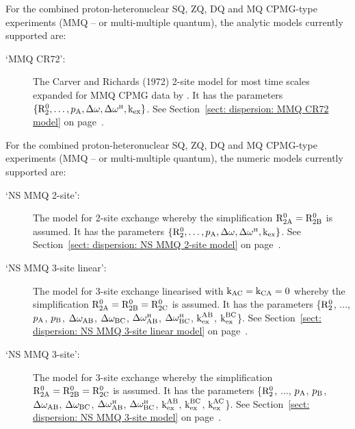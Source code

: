 For the combined proton-heteronuclear SQ, ZQ, DQ and MQ CPMG-type experiments (MMQ -- or multi-multiple quantum), the analytic models currently supported are:
\begin{description}
  \item[`MMQ CR72':]  The Carver and Richards (1972) 2-site model for most time scales expanded for MMQ CPMG data by \citet{Korzhnev04a}.
    It has the parameters $\{\mathrm{R}_2^0, \dots, p_{\textrm{A}}, \Delta\omega, \Delta\omega^{\scriptscriptstyle\mathrm{H}}, \textrm{k}_{\textrm{ex}}\}$.
    See Section~\ref{sect: dispersion: MMQ CR72 model} on page~\pageref{sect: dispersion: MMQ CR72 model}.
\end{description}


For the combined proton-heteronuclear SQ, ZQ, DQ and MQ CPMG-type experiments (MMQ -- or multi-multiple quantum), the numeric models currently supported are:
\begin{description}
  \item[`NS MMQ 2-site':]  The model for 2-site exchange whereby the simplification $\mathrm{R}_{\mathrm{2A}}^0 = \mathrm{R}_{\mathrm{2B}}^0$ is assumed.
    It has the parameters $\{\mathrm{R}_2^0, \dots, p_{\textrm{A}}, \Delta\omega, \Delta\omega^{\scriptscriptstyle\mathrm{H}}, \textrm{k}_{\textrm{ex}}\}$.
    See Section~\ref{sect: dispersion: NS MMQ 2-site model} on page~\pageref{sect: dispersion: NS MMQ 2-site model}.
  \item[`NS MMQ 3-site linear':]  The model for 3-site exchange linearised with $\textrm{k}_{\textrm{AC}}=\textrm{k}_{\textrm{CA}}=0$ whereby the simplification $\mathrm{R}_{\mathrm{2A}}^0 = \mathrm{R}_{\mathrm{2B}}^0 = \mathrm{R}_{\mathrm{2C}}^0$ is assumed.
    It has the parameters \{$\mathrm{R}_2^0$, $\dots$, $p_{\textrm{A}}$, $p_{\textrm{B}}$, $\Delta\omega_{\textrm{AB}}$, $\Delta\omega_{\textrm{BC}}$, $\Delta\omega^{\scriptscriptstyle\mathrm{H}}_{\textrm{AB}}$, $\Delta\omega^{\scriptscriptstyle\mathrm{H}}_{\textrm{BC}}$, $\textrm{k}_{\textrm{ex}}^{\textrm{AB}}$, $\textrm{k}_{\textrm{ex}}^{\textrm{BC}}$\}.
    See Section~\ref{sect: dispersion: NS MMQ 3-site linear model} on page~\pageref{sect: dispersion: NS MMQ 3-site linear model}.
  \item[`NS MMQ 3-site':]  The model for 3-site exchange whereby the simplification $\mathrm{R}_{\mathrm{2A}}^0 = \mathrm{R}_{\mathrm{2B}}^0 = \mathrm{R}_{\mathrm{2C}}^0$ is assumed.
    It has the parameters \{$\mathrm{R}_2^0$, $\dots$, $p_{\textrm{A}}$, $p_{\textrm{B}}$, $\Delta\omega_{\textrm{AB}}$, $\Delta\omega_{\textrm{BC}}$, $\Delta\omega^{\scriptscriptstyle\mathrm{H}}_{\textrm{AB}}$, $\Delta\omega^{\scriptscriptstyle\mathrm{H}}_{\textrm{BC}}$, $\textrm{k}_{\textrm{ex}}^{\textrm{AB}}$, $\textrm{k}_{\textrm{ex}}^{\textrm{BC}}$, $\textrm{k}_{\textrm{ex}}^{\textrm{AC}}$\}.
    See Section~\ref{sect: dispersion: NS MMQ 3-site model} on page~\pageref{sect: dispersion: NS MMQ 3-site model}.
\end{description}

